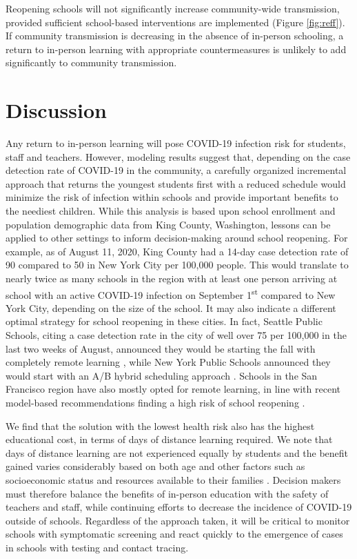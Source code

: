 \documentclass[9pt,twocolumn,twoside,lineno]{pnas-new}
\begin{document}
Reopening schools will not significantly increase community-wide transmission, provided sufficient school-based interventions are implemented (Figure \ref{fig:reff}). If community transmission is decreasing in the absence of in-person schooling, a return to in-person learning with appropriate countermeasures is unlikely to add significantly to community transmission.


\section*{Discussion}

Any return to in-person learning will pose COVID-19 infection risk for students, staff and teachers. However, modeling results suggest that, depending on the case detection rate of COVID-19 in the community, a carefully organized incremental approach that returns the youngest students first with a reduced schedule would minimize the risk of infection within schools and provide important benefits to the neediest children. While this analysis is based upon school enrollment and population demographic data from King County, Washington, lessons can be applied to other settings to inform decision-making around school reopening. For example, as of August 11, 2020, King County had a 14-day case detection rate of 90 compared to 50 in New York City per 100,000 people. This would translate to nearly twice as many schools in the region with at least one person arriving at school with an active COVID-19 infection on September 1\textsuperscript{st} compared to New York City, depending on the size of the school. It may also indicate a different optimal strategy for school reopening in these cities. In fact, Seattle Public Schools, citing a case detection rate in the city of well over 75 per 100,000 in the last two weeks of August, announced they would be starting the fall with completely remote learning \cite{staff_seattle_2020}, while New York Public Schools announced they would start with an A/B hybrid scheduling approach \cite{zaveri_new_2020}. Schools in the San Francisco region have also mostly opted for remote learning, in line with recent model-based recommendations finding a high risk of school reopening \cite{head2020effect}.

We find that the solution with the lowest health risk also has the highest educational cost, in terms of days of distance learning required. We note that days of distance learning are not experienced equally by students and the benefit gained varies considerably based on both age and other factors such as socioeconomic status and resources available to their families \cite{blundell2020covid}. Decision makers must therefore balance the benefits of in-person education with the safety of teachers and staff, while continuing efforts to decrease the incidence of COVID-19 outside of schools. Regardless of the approach taken, it will be critical to monitor schools with symptomatic screening and react quickly to the emergence of cases in schools with testing and contact tracing.
\end{document}
